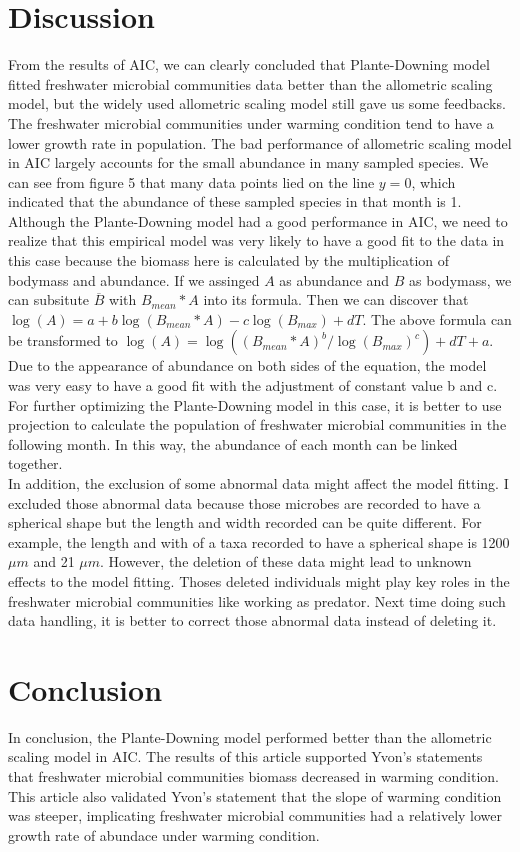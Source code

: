 \documentclass[11pt]{article}
\begin{document}
\begin{linenumbers}
\section*{Discussion}
From the results of AIC, we can clearly concluded that Plante-Downing model fitted freshwater microbial communities data better than the allometric scaling model, but the widely used allometric scaling model still gave us some feedbacks.
The freshwater microbial communities under warming condition tend to have a lower growth rate in population.
The bad performance of allometric scaling model in AIC largely accounts for the small abundance in many sampled species.
We can see from figure 5 that many data points lied on the line $y= 0$, which indicated that the abundance of these sampled species in that month is 1. \\
Although the Plante-Downing model had a good performance in AIC, we need to realize that this empirical model was very likely to have a good fit to the data in this case because the biomass here is calculated by the multiplication of bodymass and abundance.
If we assinged $A$ as abundance and $B$ as bodymass, we can subsitute $\overline{B}$ with ${B}_{mean}*A$ into its formula.
Then we can discover that $ \log(A) = a +b \log({B}_{mean}*A) - c \log(\mathit{B}_{max}) + d T$.
The above formula can be transformed to $\log(A) = \log(({B}_{mean}*A)^b/\log(\mathit{B}_{max})^c) + d T + a$.
Due to the appearance of abundance on both sides of the equation, the model was very easy to have a good fit with the adjustment of constant value b and c.
For further optimizing the Plante-Downing model in this case, it is better to use projection to calculate the population of freshwater microbial communities in the following month.
In this way, the abundance of each month can be linked together.  \\
In addition, the exclusion of some abnormal data might affect the model fitting.
I excluded those abnormal data because those microbes are recorded to have a spherical shape but the length and width recorded can be quite different.
For example, the length and with of a taxa recorded to have a spherical shape is 1200 $\mu m$ and 21 $\mu m$.
However, the deletion of these data might lead to unknown effects to the model fitting.
Thoses deleted individuals might play key roles in the freshwater microbial communities like working as predator.
Next time doing such data handling, it is better to correct those abnormal data instead of deleting it.

\section*{Conclusion}
In conclusion, the Plante-Downing model performed better than the allometric scaling model in AIC. The results of this article supported Yvon's statements that freshwater microbial communities biomass decreased in warming condition. This article also validated Yvon's statement that the slope of warming condition was steeper, implicating freshwater microbial communities had a relatively lower growth rate of abundace under warming condition.



\newpage



\end{linenumbers}
\end{document}
